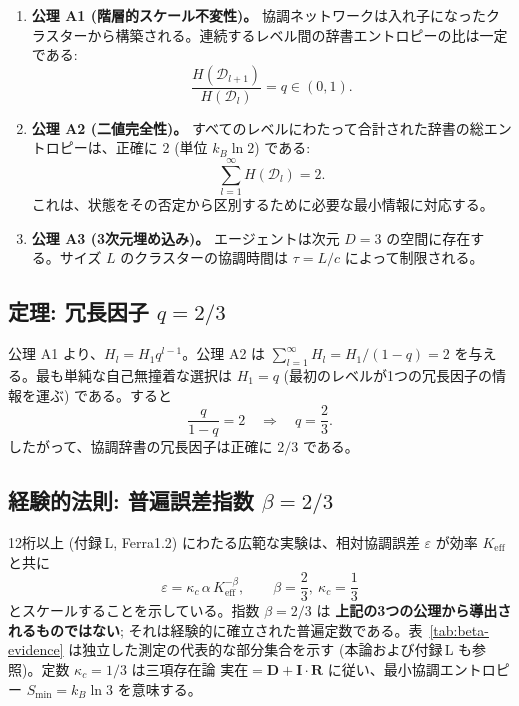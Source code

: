 \documentclass[11pt,a4paper]{article}
\theoremstyle{remark}
\begin{document}
	\begin{enumerate}
		\item \textbf{公理 A1 (階層的スケール不変性)。} 協調ネットワークは入れ子になったクラスターから構築される。連続するレベル間の辞書エントロピーの比は一定である:
		\[
		\frac{H(\mathcal{D}_{l+1})}{H(\mathcal{D}_l)} = q \in (0,1).
		\]
		
		\item \textbf{公理 A2 (二値完全性)。} すべてのレベルにわたって合計された辞書の総エントロピーは、正確に \(2\) (単位 \(k_B\ln 2\)) である:
		\[
		\sum_{l=1}^{\infty} H(\mathcal{D}_l) = 2.
		\]
		これは、状態をその否定から区別するために必要な最小情報に対応する。
		
		\item \textbf{公理 A3 (3次元埋め込み)。} エージェントは次元 \(D=3\) の空間に存在する。サイズ \(L\) のクラスターの協調時間は \(\tau = L/c\) によって制限される。
	\end{enumerate}
	
	\subsection{定理: 冗長因子 \(q = 2/3\)}
	
	公理 A1 より、\(H_l = H_1 q^{l-1}\)。公理 A2 は \(\sum_{l=1}^\infty H_l = H_1/(1-q) = 2\) を与える。最も単純な自己無撞着な選択は \(H_1 = q\) (最初のレベルが1つの冗長因子の情報を運ぶ) である。すると
	\[
	\frac{q}{1-q} = 2 \quad\Longrightarrow\quad \boxed{q = \frac{2}{3}}.
	\]
	したがって、協調辞書の冗長因子は正確に \(2/3\) である。
	
	\subsection{経験的法則: 普遍誤差指数 \(\beta = 2/3\)}
	
	12桁以上 (付録 L, Ferra1.2) にわたる広範な実験は、相対協調誤差 \(\varepsilon\) が効率 \(K_{\mathrm{eff}}\) と共に
	\[
	\varepsilon = \kappa_c \, \alpha \, K_{\mathrm{eff}}^{-\beta}, \qquad \boxed{\beta = \frac{2}{3}},\ \kappa_c = \frac{1}{3}
	\]
	とスケールすることを示している。指数 \(\beta = 2/3\) は \textbf{上記の3つの公理から導出されるものではない}; それは経験的に確立された普遍定数である。表~\ref{tab:beta-evidence} は独立した測定の代表的な部分集合を示す (本論および付録 L も参照)。定数 \(\kappa_c = 1/3\) は三項存在論 \(\text{実在} = \mathbf{D} + \mathbf{I}\!\cdot\!\mathbf{R}\) に従い、最小協調エントロピー \(S_{\min}=k_B\ln 3\) を意味する。
	
\end{document}
